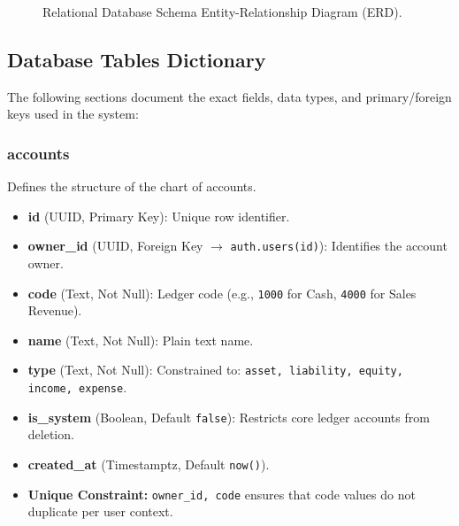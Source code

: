 \documentclass[journal, a4paper, onecolumn, 12pt]{IEEEtran}
\begin{document}
\begin{figure}[htbp]
{
}
\caption{Relational Database Schema Entity-Relationship Diagram (ERD).}
\label{fig:erd}
\end{figure}

\subsection{Database Tables Dictionary}
The following sections document the exact fields, data types, and primary/foreign keys used in the system:

\subsubsection{\textbf{accounts}}
Defines the structure of the chart of accounts.
\begin{itemize}[leftmargin=*]
    \item \textbf{id} (UUID, Primary Key): Unique row identifier.
    \item \textbf{owner\_id} (UUID, Foreign Key $\rightarrow$ \texttt{auth.users(id)}): Identifies the account owner.
    \item \textbf{code} (Text, Not Null): Ledger code (e.g., \texttt{1000} for Cash, \texttt{4000} for Sales Revenue).
    \item \textbf{name} (Text, Not Null): Plain text name.
    \item \textbf{type} (Text, Not Null): Constrained to: \texttt{asset, liability, equity, income, expense}.
    \item \textbf{is\_system} (Boolean, Default \texttt{false}): Restricts core ledger accounts from deletion.
    \item \textbf{created\_at} (Timestamptz, Default \texttt{now()}).
    \item \textbf{Unique Constraint:} \texttt{owner\_id, code} ensures that code values do not duplicate per user context.
\end{itemize}
\end{document}
